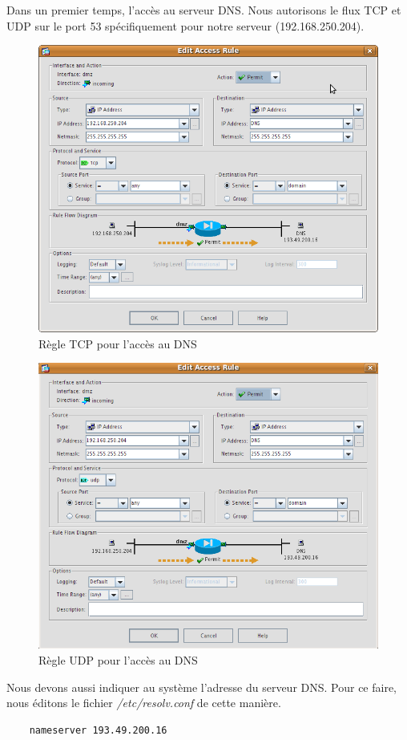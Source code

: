 \documentclass[a4paper,12pt]{article}
\begin{document}
Dans un premier temps, l'accès au serveur DNS. Nous autorisons le flux TCP et UDP sur le port 53 spécifiquement pour notre serveur (192.168.250.204).
\begin{figure}[H]
	\center
	\includegraphics[width=12cm]{img/12-policydmzdnstcp.png}
	\caption{Règle TCP pour l'accès au DNS}
\end{figure}
\begin{figure}[H]
	\center
	\includegraphics[width=12cm]{img/12-policydmzdnsudp.png}
	\caption{Règle UDP pour l'accès au DNS}
\end{figure}

Nous devons aussi indiquer au système l'adresse du serveur DNS. Pour ce faire, nous éditons le fichier \textit{/etc/resolv.conf} de cette manière.
\begin{lstlisting}
	nameserver 193.49.200.16
\end{lstlisting}
\end{document}
